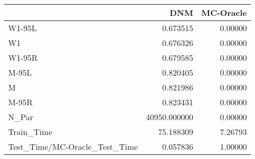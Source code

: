 \begin{tabular}{lrr}
\toprule
{} &           DNM &  MC-Oracle \\
\midrule
W1-95L                        &      0.673515 &    0.00000 \\
W1                            &      0.676326 &    0.00000 \\
W1-95R                        &      0.679585 &    0.00000 \\
M-95L                         &      0.820405 &    0.00000 \\
M                             &      0.821986 &    0.00000 \\
M-95R                         &      0.823431 &    0.00000 \\
N\_Par                         &  40950.000000 &    0.00000 \\
Train\_Time                    &     75.188309 &    7.26793 \\
Test\_Time/MC-Oracle\_Test\_Time &      0.057836 &    1.00000 \\
\bottomrule
\end{tabular}
